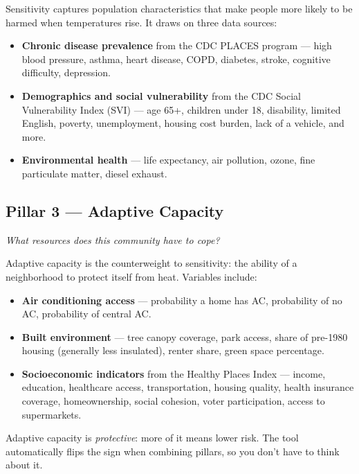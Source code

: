 \documentclass[11pt]{article}
\begin{document}
Sensitivity captures population characteristics that make people more likely
to be harmed when temperatures rise. It draws on three data sources:

\begin{itemize}[leftmargin=*]
  \item \textbf{Chronic disease prevalence} from the CDC PLACES program ---
        high blood pressure, asthma, heart disease, COPD, diabetes, stroke,
        cognitive difficulty, depression.
  \item \textbf{Demographics and social vulnerability} from the CDC Social
        Vulnerability Index (SVI) --- age 65+, children under 18, disability,
        limited English, poverty, unemployment, housing cost burden, lack of
        a vehicle, and more.
  \item \textbf{Environmental health} --- life expectancy, air pollution,
        ozone, fine particulate matter, diesel exhaust.
\end{itemize}

\subsection*{\textcolor{adaptive}{Pillar 3 --- Adaptive Capacity}}
\textit{What resources does this community have to cope?}

Adaptive capacity is the counterweight to sensitivity: the ability of a
neighborhood to protect itself from heat. Variables include:

\begin{itemize}[leftmargin=*]
  \item \textbf{Air conditioning access} --- probability a home has AC,
        probability of no AC, probability of central AC.
  \item \textbf{Built environment} --- tree canopy coverage, park access,
        share of pre-1980 housing (generally less insulated), renter share,
        green space percentage.
  \item \textbf{Socioeconomic indicators} from the Healthy Places Index ---
        income, education, healthcare access, transportation, housing
        quality, health insurance coverage, homeownership, social cohesion,
        voter participation, access to supermarkets.
\end{itemize}

\begin{cautionbox}
Adaptive capacity is \textit{protective}: more of it means lower risk. The
tool automatically flips the sign when combining pillars, so you don't have
to think about it.
\end{cautionbox}
\end{document}

